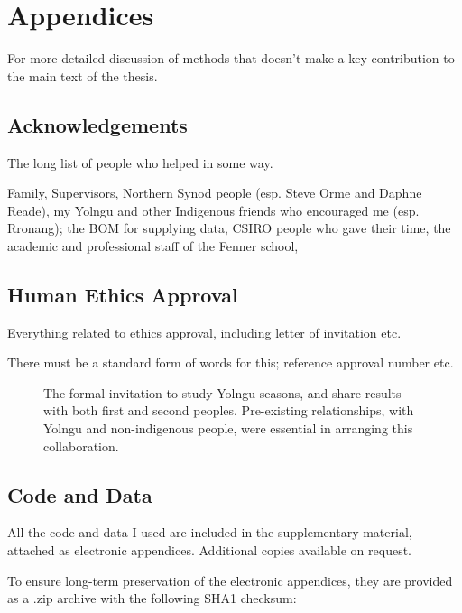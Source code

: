 \chapter{Appendices}
\label{ch:appendicies}


For more detailed discussion of methods that doesn't make a key contribution to the main text of the thesis.

\section{Acknowledgements}
The long list of people who helped in some way.

Family, Supervisors, Northern Synod people (esp. Steve Orme and Daphne Reade),
my Yolngu and other Indigenous friends who encouraged me (esp. Rronang);
the BOM for supplying data, CSIRO people who gave their time,
the academic and professional staff of the Fenner school,


\section{Human Ethics Approval} \label{sec:ethics}
Everything related to ethics approval, including letter of invitation etc.

There must be a standard form of words for this; reference approval number etc.

\begin{figure}[p]
    \centering
    \caption[Letter of invitation for collaborative research]{
        The formal invitation to study Yolngu seasons,
        and share results with both first and second peoples.
        Pre-existing relationships, with Yolngu and non-indigenous people,
        were essential in arranging this collaboration.
        }
    \label{app:invitation-letter}
\end{figure}


\section{Code and Data} \label{sec:appendix-code}
All the code and data I used are included in the supplementary material,
attached as electronic appendices.  Additional copies available on request.

To ensure long-term preservation of the electronic appendices, they
are provided as a .zip archive with the following SHA1 checksum:

